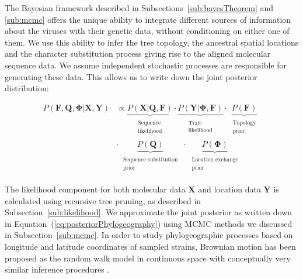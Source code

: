 The Bayesian framework described in Subsections~\ref{sub:bayesTheorem} and \ref{sub:mcmc} offers the unique ability to integrate different sources of information about the viruses with their genetic data, without conditioning on either one of them.
We use this ability to infer the tree topology, the ancestral spatial locations and the character substitution process giving rise to the aligned molecular sequence data. 
We assume independent stochastic processes are responsible for generating these data.
This allows us to write down the joint posterior distribution: 

\begin{align}
P\left(\mathbf{F}, \mathbf{Q}, \mathbf{\Phi}|\mathbf{X},\mathbf{Y}\right) &\propto 
\underbrace{P(\mathbf{X}|\mathbf{Q}, \mathbf{F})}_{\begin{array}{c}
\substack{\text{Sequence} \\ \text{likelihood}}
\end{array}}\cdot\underbrace{P(\mathbf{Y}|\mathbf{\Phi}, \mathbf{F})}_{\begin{array}{c}
\substack{\text{Trait} \\ \text{likelihood}}
\end{array}}\cdot
\underbrace{P(\mathbf{F})}_{\begin{array}{c}
\substack{\text{Topology} \\ \text{prior}}
\end{array}} \nonumber \\
& \cdot \underbrace{P(\mathbf{Q})}_{\begin{array}{c}
\substack{\text{Sequence substitution} \\ \text{prior}}
\end{array}}\cdot\underbrace{P(\mathbf{\Phi})}_{\begin{array}{c}
\substack{\text{Location exchange} \\ \text{prior}}
\end{array}}
\label{eq:posteriorPhylogeography}
\end{align}

The likelihood component for both molecular data $\mathbf{X}$ and location data $\mathbf{Y}$ is calculated using recursive tree pruning, as described in Subsection~\ref{sub:likelihood}.
We approximate the joint posterior as written down in Equation~(\ref{eq:posteriorPhylogeography}) using MCMC methods we discussed in Subsection~\ref{sub:mcmc}.
In order to study phylogeographic processes based on longitude and latitude coordinates of sampled strains, Brownian motion has been proposed as the random walk model in continuous space with conceptually very similar inference procedures \citep{Lemey2010}.



